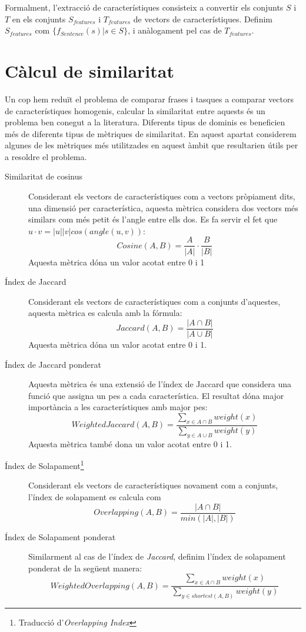 Formalment, l'extracció de característiques consisteix a convertir els conjunts $S$ i $T$ en els conjunts $S_{features}$ i $T_{features}$ de vectors de característiques. Definim $S_{features}$ com $\{f_{Sentence}(s) | s \in S\}$, i anàlogament pel cas de $T_{features}$.

\section{Càlcul de similaritat}
\label{sec:enfoc-similaritat}

Un cop hem reduït el problema de comparar frases i tasques a comparar vectors de característiques homogenis, calcular la similaritat entre aquests és un problema ben conegut a la literatura\cite{similarity}. Diferents tipus de dominis es beneficien més de diferents tipus de mètriques de similaritat. En aquest apartat considerem algunes de les mètriques més utilitzades en aquest àmbit que resultarien útils per a resoldre el problema.

\begin{description} 
    \item[Similaritat de cosinus]{Considerant els vectors de característiques com a vectors pròpiament dits, una dimensió per característica, aquesta mètrica considera dos vectors més similars com més petit és l'angle entre ells dos. Es fa servir el fet que $u \cdot v = |u| |v| cos(angle(u,v))$:$$Cosine(A, B) = \frac{A}{|A|} \cdot \frac{B}{|B|}$$ Aquesta mètrica dóna un valor acotat entre 0 i 1}
    \item[Índex de Jaccard]{Considerant els vectors de característiques com a conjunts d'aquestes, aquesta mètrica es calcula amb la fórmula: $$Jaccard(A,B) = \frac{|A\cap B|}{|A\cup B|}$$ Aquesta mètrica dóna un valor acotat entre 0 i 1.}
    \item[Índex de Jaccard ponderat]{Aquesta mètrica és una extensió de l'índex de Jaccard que considera una funció que assigna un pes a cada característica. El resultat dóna major importància a les característiques amb major pes: $$WeightedJaccard(A,B) = \frac{\sum_{x \in A\cap B}{weight(x)}}{\sum_{y\in A\cup B}{weight(y)}}$$ Aquesta mètrica també dona un valor acotat entre 0 i 1.}
    \item[Índex de Solapament\footnote{Traducció d'\emph{Overlapping Index}}]{Considerant els vectors de característiques novament com a conjunts, l'índex de solapament es calcula com $$Overlapping(A,B) = \frac{|A\cap B|}{min(|A|, |B|)}$$}
    \item[Índex de Solapament ponderat]{Similarment al cas de l'índex de \emph{Jaccard}, definim l'índex de solapament ponderat de la següent manera:$$WeightedOverlapping(A,B) = \frac{\sum_{x \in A\cap B}{weight(x)}}{\sum_{y\in shortest(A,B)}{weight(y)}}$$}
\end{description}

